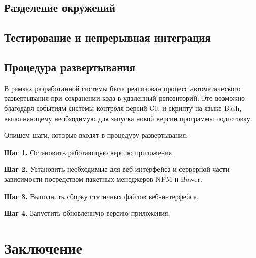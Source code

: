 \documentclass[a4paper,14pt,href]{article}
\begin{document}

\subsection{Разделение окружений}

\subsection{Тестирование и непрерывная интеграция}

\subsection{Процедура развертывания}
В рамках разработанной системы была реализован процесс автоматического развертывания при сохранении кода в удаленный
репозиторий. Это возможно благодаря событиям системы контроля версий Git и скрипту на языке Bash, выполняющему необходимую
для запуска новой версии программы подготовку\cite{PushDeploy}.

Опишем шаги, которые входят в процедуру развертывания:
\begin{description}
  \item \textbf{Шаг 1.} Остановить работающую версию приложения.
  \item \textbf{Шаг 2.} Установить необходимые для веб-интерфейса и серверной части зависимости посредством пакетных
    менеджеров NPM и Bower.
  \item \textbf{Шаг 3.} Выполнить сборку статичных файлов веб-интерфейса.
  \item \textbf{Шаг 4.} Запустить обновленную версию приложения.
\end{description}

\newpage
\section*{Заключение}


\newpage
{}



\end{document}
